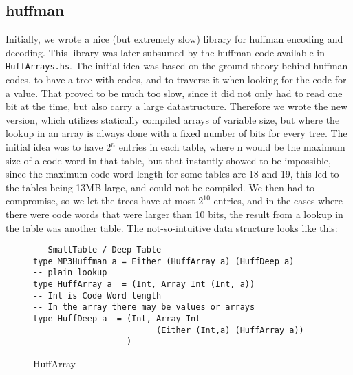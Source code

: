 \documentclass[a4paper,12pt]{article}
\begin{document}
    \subsection{huffman}
    \label{sec:huffman}
        Initially, we wrote a nice (but extremely slow) library for huffman
        encoding and decoding. This library was later subsumed by the huffman
        code available in \texttt{HuffArrays.hs}. The initial idea was based on the
        ground theory behind huffman codes, to have a tree with codes, and to
        traverse it when looking for the code for a value. That proved to be
        much too slow, since it did not only had to read one bit at the time,
        but also carry a large datastructure. Therefore we wrote the new
        version, which utilizes statically compiled arrays of variable size, but
        where the lookup in an array is always done with a fixed number of bits
        for every tree. The initial idea was to have $2^n$ entries in each
        table, where n would be the maximum size of a code word in that table,
        but that instantly showed to be impossible, since the maximum code word
        length for some tables are 18 and 19, this led to the tables being 13MB
        large, and could not be compiled. We then had to compromise, so we let
        the trees have at most $2^{10}$ entries, and in the cases where there were
        code words that were larger than 10 bits, the result from a lookup in
        the table was another table. The not-so-intuitive data structure looks
        like this:
\begin{figure}[H]
  \begin{center}
        \begin{lstlisting}
-- SmallTable / Deep Table
type MP3Huffman a = Either (HuffArray a) (HuffDeep a)
-- plain lookup
type HuffArray a  = (Int, Array Int (Int, a))
-- Int is Code Word length
-- In the array there may be values or arrays
type HuffDeep a  = (Int, Array Int
                         (Either (Int,a) (HuffArray a))
                   )
        \end{lstlisting}
    \caption{HuffArray}\label{fig:huffarraycode}
  \end{center}
\end{figure}
\end{document}
